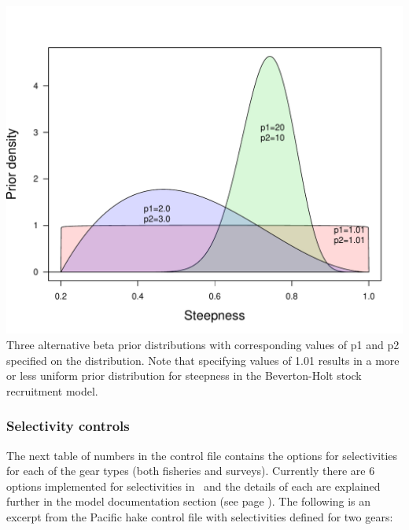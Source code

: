 \begin{multicols}{2}
\begin{figurehere}
	\centering
	\includegraphics[width=\columnwidth]{iscamFigs/betaPriors.pdf}\\
	\caption{Three alternative beta prior distributions with corresponding values of p1 and p2 specified on the distribution.  Note that specifying values of 1.01 results in a more or less uniform prior distribution for steepness in the Beverton-Holt stock recruitment model.}\label{label}
\end{figurehere}

\subsubsection{Selectivity controls}
The next table of numbers in the control file contains the options for selectivities for each of the gear types (both fisheries and surveys).  Currently there are 6 options implemented for selectivities in \iscam\, and the details of each are explained further in the model documentation section (see page \pageref{ModelDocSelectivity}).  The following is an excerpt from the Pacific hake control file with selectivities defined for two gears:


\end{multicols}
